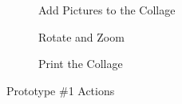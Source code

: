 \documentclass{tei2013}
\begin{document}
\begin{figure}[htb]
\begin{subfigure}[b]{.24\textwidth}
\end{subfigure}
\begin{subfigure}[b]{.24\textwidth}
\centering
{}
\caption{Add Pictures to the Collage}
\label{fig:prototype1-5}
\end{subfigure}
\begin{subfigure}[b]{.24\textwidth}
\centering
{}
\caption{Rotate and Zoom}
\label{fig:prototype1-6}
\end{subfigure}
\begin{subfigure}[b]{.24\textwidth}
\centering
{}
\caption{Print the Collage}
\label{fig:prototype1-7}
\end{subfigure}

\caption{Prototype \#1 Actions}
\end{figure}

\end{document}
